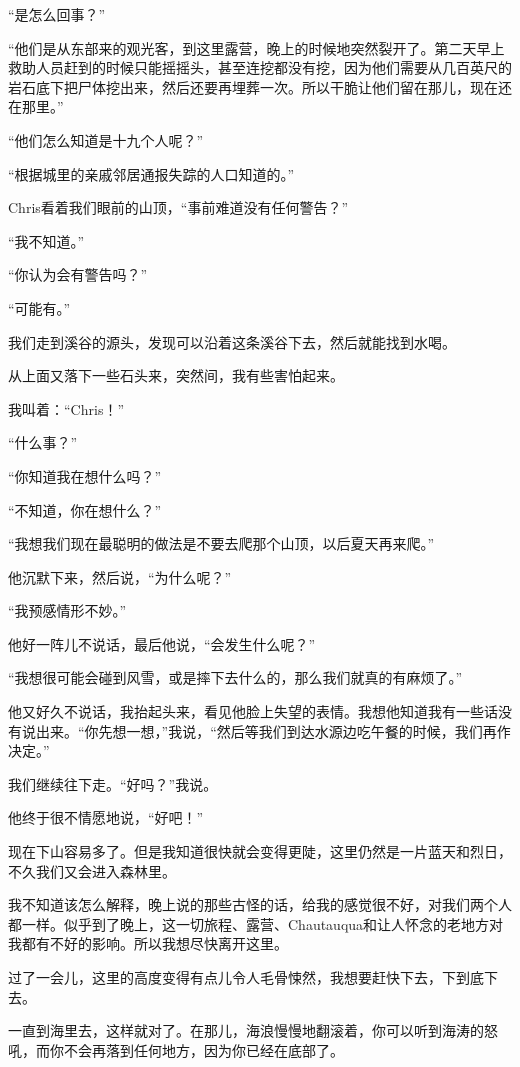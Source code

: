 \documentclass[UTF8]{article}
\begin{document}
\par “是怎么回事？”
\par “他们是从东部来的观光客，到这里露营，晚上的时候地突然裂开了。第二天早上救助人员赶到的时候只能摇摇头，甚至连挖都没有挖，因为他们需要从几百英尺的岩石底下把尸体挖出来，然后还要再埋葬一次。所以干脆让他们留在那儿，现在还在那里。”
\par “他们怎么知道是十九个人呢？”
\par “根据城里的亲戚邻居通报失踪的人口知道的。”
\par Chris看着我们眼前的山顶，“事前难道没有任何警告？”
\par “我不知道。”
\par “你认为会有警告吗？”
\par “可能有。”
\par 我们走到溪谷的源头，发现可以沿着这条溪谷下去，然后就能找到水喝。
\par 从上面又落下一些石头来，突然间，我有些害怕起来。
\par 我叫着：“Chris！”
\par “什么事？”
\par “你知道我在想什么吗？”
\par “不知道，你在想什么？”
\par “我想我们现在最聪明的做法是不要去爬那个山顶，以后夏天再来爬。”
\par 他沉默下来，然后说，“为什么呢？”
\par “我预感情形不妙。”
\par 他好一阵儿不说话，最后他说，“会发生什么呢？”
\par “我想很可能会碰到风雪，或是摔下去什么的，那么我们就真的有麻烦了。”
\par 他又好久不说话，我抬起头来，看见他脸上失望的表情。我想他知道我有一些话没有说出来。“你先想一想，”我说，“然后等我们到达水源边吃午餐的时候，我们再作决定。”
\par 我们继续往下走。“好吗？”我说。
\par 他终于很不情愿地说，“好吧！”
\par 现在下山容易多了。但是我知道很快就会变得更陡，这里仍然是一片蓝天和烈日，不久我们又会进入森林里。
\par 我不知道该怎么解释，晚上说的那些古怪的话，给我的感觉很不好，对我们两个人都一样。似乎到了晚上，这一切旅程、露营、Chautauqua和让人怀念的老地方对我都有不好的影响。所以我想尽快离开这里。
\par 过了一会儿，这里的高度变得有点儿令人毛骨悚然，我想要赶快下去，下到底下去。
\par 一直到海里去，这样就对了。在那儿，海浪慢慢地翻滚着，你可以听到海涛的怒吼，而你不会再落到任何地方，因为你已经在底部了。
\end{document}
